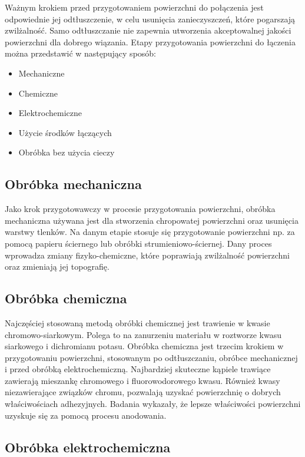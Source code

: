 \documentclass[magister,druk]{dyplom}
\begin{document}
Ważnym krokiem przed przygotowaniem powierzchni do połączenia jest odpowiednie jej odtłuszczenie, w celu usunięcia zanieczyszczeń, które pogarszają zwilżalność. Samo odtłuszczanie nie zapewnia utworzenia akceptowalnej jakości powierzchni dla dobrego wiązania. Etapy przygotowania powierzchni do łączenia można przedstawić w następujący sposób\cite{FMLRev}:

\begin{itemize}
	\item Mechaniczne
	\item Chemiczne
	\item Elektrochemiczne
	\item Użycie środków łączących
	\item Obróbka bez użycia cieczy	
\end{itemize} 

\subsection{Obróbka mechaniczna}

Jako krok przygotowawczy w procesie przygotowania powierzchni, obróbka mechaniczna używana jest dla stworzenia chropowatej powierzchni oraz usunięcia warstwy tlenków. Na danym etapie stosuje się przygotowanie powierzchni np. za pomocą papieru ściernego lub obróbki strumieniowo-ściernej. Dany proces wprowadza zmiany fizyko-chemiczne, które poprawiają zwilżalność powierzchni oraz zmieniają jej topografię. 

\subsection{Obróbka chemiczna}

Najczęściej stosowaną metodą obróbki chemicznej jest trawienie w kwasie chromowo-siarkowym. Polega to na zanurzeniu materiału w roztworze kwasu siarkowego i dichromianu potasu. Obróbka chemiczna jest trzecim krokiem w przygotowaniu powierzchni, stosowanym po odtłuszczaniu, obróbce mechanicznej i przed obróbką elektrochemiczną. Najbardziej skuteczne kąpiele trawiące zawierają mieszankę chromowego i fluorowodorowego kwasu. Również kwasy niezawierające związków chromu, pozwalają uzyskać powierzchnię o dobrych właściwościach adhezyjnych. Badania \cite{surface} wykazały, że lepsze właściwości powierzchni uzyskuje się za pomocą procesu anodowania.  

\subsection{Obróbka elektrochemiczna}
\end{document}

